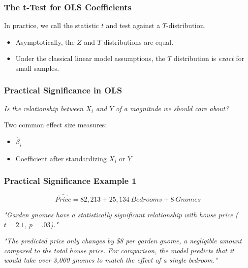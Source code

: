 \documentclass[12pt, block=fill]{beamer}
\begin{document}
\begin{frame}
  \frametitle{The t-Test for OLS Coefficients}
  In practice, we call the statistic $t$ and test against a
  $T$-distribution. 
  \begin{itemize}
\item Asymptotically, the $Z$ and $T$ distributions are equal.
\item Under the classical linear model assumptions, the $T$
  distribution is \textit{exact} for small samples. 
\end{itemize}

\end{frame}



\begin{frame}
  \frametitle{Practical Significance in OLS}
  
  \textit{Is the relationship between $X_i$ and $Y$ of a magnitude we should care about?}
  \vspace{1cm}
  
  Two common effect size measures:
  \begin{itemize}
\item $\hat \beta_i$
\item Coefficient after standardizing $X_i$ or $Y$
\end{itemize}

\end{frame}



\begin{frame}
  \frametitle{Practical Significance Example 1}


$$\widehat{Price} = 82,213 + 25,134 \ Bedrooms + 8 \ Gnomes$$

\textit{"Garden gnomes have a statistically significant relationship
  with house price ($t=2.1$, $p = .03$)."}
\pause

\textit{"The predicted price only changes by \$8 per garden gnome, a
  negligible amount compared to the total house price.  For
  comparison, the model predicts that it would take over 3,000 gnomes
  to match the effect of a single bedroom."} 
\end{frame}
\end{document}
